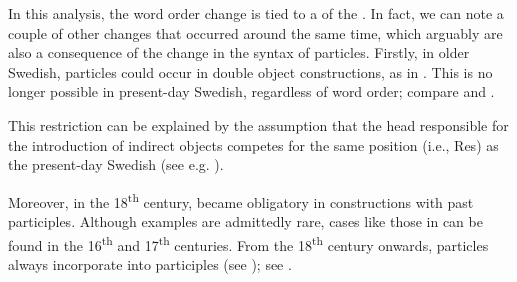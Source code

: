 \documentclass[output=paper]{langscibook}
\begin{document}
In this analysis, the word order change is tied to a  of the . In fact, we can note a couple of other changes that occurred around the same time, which arguably are also a consequence of the change in the syntax of particles. Firstly, in older Swedish,  particles could occur in double object constructions, as in . This is no longer possible in present-day Swedish, regardless of word order; compare  and .


\ea\label{ex:lalu:58}

\z
\ex\label{ex:lalu:59}

\z
\ex\label{ex:lalu:60}
\z
\z


This restriction can be explained by the assumption that the head responsible for the introduction of indirect objects competes for the same position (i.e., Res) as the present-day Swedish  (see e.g. \citealt{Ramchand2008}).



Moreover, in the 18\textsuperscript{th} century,   became obligatory in constructions with past participles. Although examples are admittedly rare, cases like those in  can be found in the 16\textsuperscript{th} and 17\textsuperscript{th} centuries. From the 18\textsuperscript{th} century onwards, particles always incorporate into participles (see \citealt{Lundquist2014Passives}); see .
\end{document}
